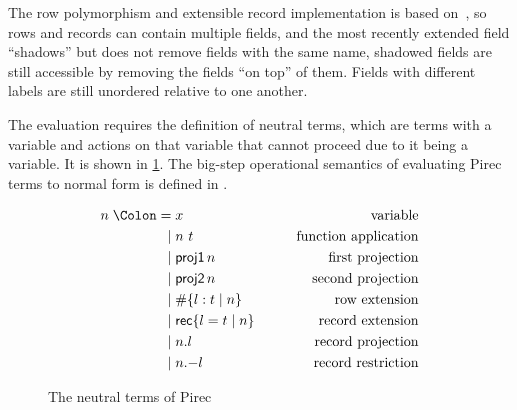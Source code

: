 The row polymorphism and extensible record implementation is based
on~\cite{scopedlabels}, so rows and records can contain multiple fields, and the
most recently extended field \enquote{shadows} but does not remove fields with
the same name, shadowed fields are still accessible by removing the fields
\enquote{on top} of them. Fields with different labels are still unordered
relative to one another.

The evaluation requires the definition of neutral terms, which are terms with a
variable and actions on that variable that cannot proceed due to it being a
variable. It is shown in \cref{fig:neutral}. The big-step operational semantics
of evaluating Pirec terms to normal form is defined in .

\begin{figure}
  \begin{alignat*}{2}
    n \Coleqq{} & x
                & \qquad\text{variable}             \\
    \mid{}      & n\ t
                & \qquad\text{function application} \\
    \mid{}      & {\ProjOne n}
                & \qquad\text{first projection}     \\
    \mid{}      & {\ProjTwo n}
                & \qquad\text{second projection}    \\
    \mid{}      & \# \{ l : t \mid n \}
                & \qquad\text{row extension}        \\
    \mid{}      & {\RecordLit \{ l = t \mid n \}}
                & \qquad\text{record extension}     \\
    \mid{}      & n.l
                & \qquad\text{record projection}    \\
    \mid{}      & n \RecordRestr l
                & \qquad\text{record restriction}
  \end{alignat*}
  \caption{The neutral terms of Pirec}\label{fig:neutral}
\end{figure}

